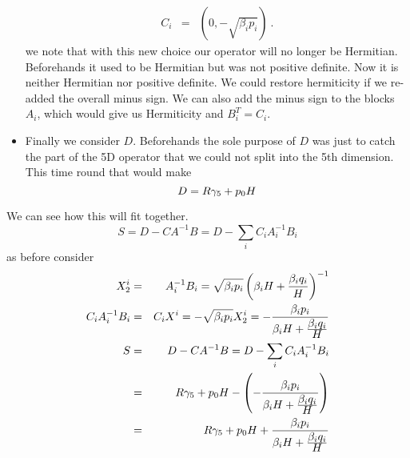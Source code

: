 \documentclass[12pt]{article}
\begin{document}
\begin{itemize}
\begin{eqnarray}
C_{i} &=&  \left( 0, -\sqrt{ \beta_i p_i } \right) \ .
\end{eqnarray}
we note that with this new choice our operator will no longer be Hermitian.
Beforehands it used to be Hermitian but was not positive definite. Now
it is neither Hermitian nor positive definite. We could restore hermiticity
if we re-added the overall minus sign. We can also add the minus sign
to the blocks $A_i$, which would give us Hermiticity and $B_i^T=C_i$.
\item
Finally we consider $D$. Beforehands the sole purpose of $D$ was just
to catch the part of the 5D operator that we could not split into the 
5th dimension. This time round that would make
\begin{equation}
D = R \gamma_5 + p_0 H
\end{equation}
\end{itemize}

We can see how this will fit together.
\begin{equation}
S = D - C A^{-1} B = D - \sum_{i} C_i A_{i}^{-1} B_{i} 
\end{equation}
as before consider 
\begin{eqnarray}
X_2^{i} &=& A_{i}^{-1} B_{i} = \sqrt{\beta_i p_i} \left( \beta_i H + \frac{\displaystyle \beta_i q_i}{\displaystyle H} \right)^{-1} \\
C_i A_{i}^{-1} B_{i} &=&  C_{i} X^{i} = -\sqrt{\beta_i p_i} X_2^{i} = -\frac{\beta_i p_i}{  \beta_i H + \frac{\displaystyle \beta_i q_i}{\displaystyle H} } \\ 
S &=& D - CA^{-1}B =  D - \sum_{i} C_i A_{i}^{-1} B_{i} \\
&=& R\gamma_5 + p_0 H - \left( -\frac{\beta_i p_i}{  \beta_i H + \frac{\displaystyle \beta_i q_i}{\displaystyle H} } \right) \\ 
&=& R\gamma_5 + p_0 H + \frac{\beta_i p_i}{  \beta_i H + \frac{\displaystyle \beta_i q_i}{\displaystyle H} }
\end{eqnarray}
\end{document}
